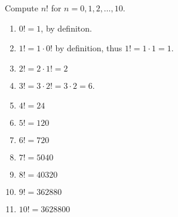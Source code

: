 \guard



\begin{exmp}
\label{exmp:computeFactorials}
  Compute $n!$ for $n=0,1,2,\dots,10$.
  \begin{enumerate}
    \item $0!=1$, by definiton.
    \item $1! = 1\cdot 0 !$ by definition, thus $1!= 1\cdot 1 = 1$.
    \item $2! = 2\cdot 1!= 2$
    \item $3! = 3\cdot 2! = 3\cdot 2 = 6$.
    \item $4! = 24$
    \item $5! = 120$
    \item $6! = 720$
    \item $7! = 5040$
    \item $8! = 40320$
    \item $9! = 362880$
    \item $10!= 3628800$
  \end{enumerate}
\end{exmp}
